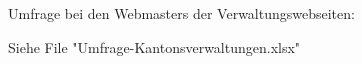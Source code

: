 \label{appendix:umfrage}
Umfrage bei den Webmasters der Verwaltungswebseiten:

Siehe File "Umfrage-Kantonsverwaltungen.xlsx"